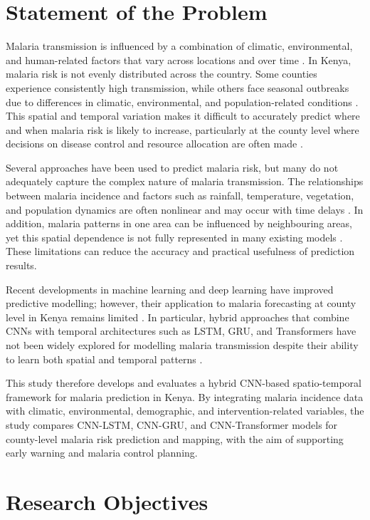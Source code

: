 \section{Statement of the Problem}
Malaria transmission is influenced by a combination of climatic, environmental, and human-related factors that vary across locations and over time \cite{amek2012spatial,Okunlola2019}. In Kenya, malaria risk is not evenly distributed across the country. Some counties experience consistently high transmission, while others face seasonal outbreaks due to differences in climatic, environmental, and population-related conditions \cite{Gething2023}. This spatial and temporal variation makes it difficult to accurately predict where and when malaria risk is likely to increase, particularly at the county level where decisions on disease control and resource allocation are often made \cite{Odhiambo2020}.

 Several approaches have been used to predict malaria risk, but many do not adequately capture the complex nature of malaria transmission. The relationships between malaria incidence and factors such as rainfall, temperature, vegetation, and population dynamics are often nonlinear and may occur with time delays \cite{Syafei2023,Laneri2010}. In addition, malaria patterns in one area can be influenced by neighbouring areas, yet this spatial dependence is not fully represented in many existing models \cite{Odhiambo2020}. These limitations can reduce the accuracy and practical usefulness of prediction results.

 Recent developments in machine learning and deep learning have improved predictive modelling; however, their application to malaria forecasting at county level in Kenya remains limited \cite{Odhiambo2020,Gething2023}. In particular, hybrid approaches that combine CNNs with temporal architectures such as LSTM, GRU, and Transformers have not been widely explored for modelling malaria transmission despite their ability to learn both spatial and temporal patterns \cite{Rasheed2023}.

 This study therefore develops and evaluates a hybrid CNN-based spatio-temporal framework for malaria prediction in Kenya. By integrating malaria incidence data with climatic, environmental, demographic, and intervention-related variables, the study compares CNN-LSTM, CNN-GRU, and CNN-Transformer models for county-level malaria risk prediction and mapping, with the aim of supporting early warning and malaria control planning.
\section{Research Objectives}

